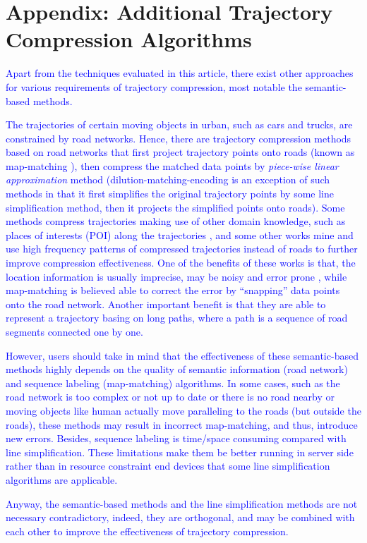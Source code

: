 \section*{{Appendix: Additional Trajectory Compression Algorithms}}
\textcolor{blue}{Apart from the techniques evaluated in this article, there exist other approaches for various requirements of trajectory compression, most notable the semantic-based methods.}

\textcolor{blue}{The trajectories of certain moving objects in urban, such as cars and trucks, are constrained by road networks. Hence, there are trajectory compression methods based on road networks \cite{Chen:Trajectory, Popa:Spatio,Civilis:Techniques,Hung:Clustering, Kellaris:Map, Song:PRESS, Han:Compress, Cao:Road} that first project trajectory points onto roads (known as map-matching \cite{Quddus:MapMatching}), then compress the matched data points by \emph{piece-wise linear approximation} method \cite{Elmeleegy:Stream, Xie:Stream,Luo:Streaming,ORourke:Fitting} (dilution-matching-encoding \cite{Gotsman:Compaction} is an exception of such methods in that it first simplifies the original trajectory points by some line simplification method, then it projects the simplified points onto roads).}
%
\textcolor{blue}{Some methods \cite{Schmid:Semantic, Richter:Semantic} compress trajectories making use of other domain knowledge, such as places of interests (POI) along the trajectories \cite{Richter:Semantic}, and some other works \cite{Gotsman:Compaction, Song:PRESS, Han:Compress,Koide:CiNCT} mine and use high frequency patterns of compressed trajectories instead of roads to further improve compression effectiveness.}
%
\textcolor{blue}{One of the benefits of these works is that, the location information is usually imprecise, may be noisy and error prone \cite{Cao:Road}, while map-matching is believed able to correct the error by “snapping” data points onto the road network.
Another important benefit is that they are able to represent a trajectory basing on long paths, where a path is a sequence of road segments connected one by one.}

\textcolor{blue}{However, users should take in mind that the effectiveness of these semantic-based methods highly depends on the quality of semantic information (\eg road network) and sequence labeling (\eg map-matching) algorithms. In some cases, such as the road network is too complex or not up to date or there is no road nearby or moving objects like human actually move paralleling to the roads (but outside the roads), these methods may result in incorrect map-matching, and thus, introduce new errors.}
\textcolor{blue}{Besides, sequence labeling is time/space consuming compared with line simplification. These limitations make them be better running in server side rather than in resource constraint end devices that some line simplification algorithms are applicable.}

\textcolor{blue}{Anyway, the semantic-based methods and the line simplification methods are not necessary contradictory, indeed, they are orthogonal, and may be combined with each other to improve the effectiveness of trajectory compression.}



